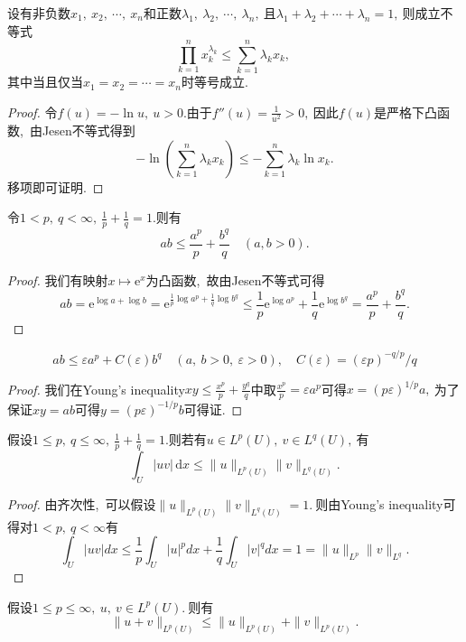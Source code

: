 \begin{proposition}
	设有非负数$x_1,\ x_2,\ \cdots,\ x_n$和正数$\lambda_1,\ \lambda_2,\ \cdots,\ \lambda_n,\ $且$\lambda_1+\lambda_2+\cdots+\lambda_n=1,\ $则成立不等式
	$$\prod_{k=1}^{n}x_k^{\lambda_k}\leqslant\sum_{k=1}^{n}\lambda_kx_k,\ $$
	其中当且仅当$x_1=x_2=\cdots=x_n$时等号成立.
\end{proposition}
\begin{proof}
	令$f(u)=-\ln u,\ u>0.$由于$f''(u)=\frac{1}{u^2}>0,\ $因此$f(u)$是严格下凸函数,\ 由Jesen不等式得到
	$$-\ln\left(\sum_{k=1}^{n}\lambda_kx_k\right)\leqslant-\sum_{k=1}^{n}\lambda_k\ln x_k.$$
	移项即可证明.
\end{proof}
\begin{proposition}
	令$1<p,\ q<\infty,\ \frac{1}{p}+\frac{1}{q}=1.$则有
	$$ab\leqslant\frac{a^{p}}{p}+\frac{b^{q}}{q}\quad(a,b>0).$$
\end{proposition}
\begin{proof}
	我们有映射$x\mapsto \mathrm{e}^x$为凸函数,\ 故由Jesen不等式可得
	$$ab=\mathrm{e}^{\log a+\log b}=\mathrm{e}^{\frac1p\log a^p+\frac1q\log b^q}\leq\frac1p\mathrm{e}^{\log a^p}+\frac1q\mathrm{e}^{\log b^q}=\frac{a^p}p+\frac{b^q}q.$$
\end{proof}
\begin{proposition}
	$$ab\leqslant\varepsilon a^p+C(\varepsilon)b^q\quad(a,\ b>0,\ \varepsilon>0),\quad C(\varepsilon)=(\varepsilon p)^{-q/p}/q$$
\end{proposition}
\begin{proof}
	我们在Young's inequality$xy\leqslant\frac{x^{p}}{p}+\frac{y^{q}}{q}$中取$\frac{x^p}{p}=\varepsilon a^p$可得$x=(p\varepsilon)^{1/p}a,\ $为了保证$xy=ab$可得$y=(p\varepsilon)^{-1/p}b$可得证.
\end{proof}
\begin{proposition}[H\"{o}lder不等式]
	假设$1\leqslant p,\ q\leqslant\infty,\ \frac{1}{p}+\frac{1}{q}=1.$则若有$u\in L^p(U),\ v\in L^q(U),\ $有
	$$\int_U |uv|\,\mathrm{d}x\leqslant\|u\|_{L^p(U)}\|v\|_{L^q(U)}.$$
\end{proposition}
\begin{proof}
	由齐次性,\ 可以假设$\|u\|_{L^p(U)}\|v\|_{L^q(U)}=1.\ $则由Young's inequality可得对$1<p,\ q<\infty$有
	$$\int_U|uv| dx\leq\frac1p\int_U|u|^p dx+\frac1q\int_U|v|^q dx=1=\|u\|_{L^p}\|v\|_{L^q}.$$
\end{proof}
\begin{proposition}[Minkowski不等式]
	假设$1\leqslant p\leqslant\infty,\ u,\ v\in L^p(U).\ $则有
	$$\|u+v\|_{L^p(U)}\leqslant\|u\|_{L^p(U)}+\|v\|_{L^p(U)}.$$
\end{proposition}
